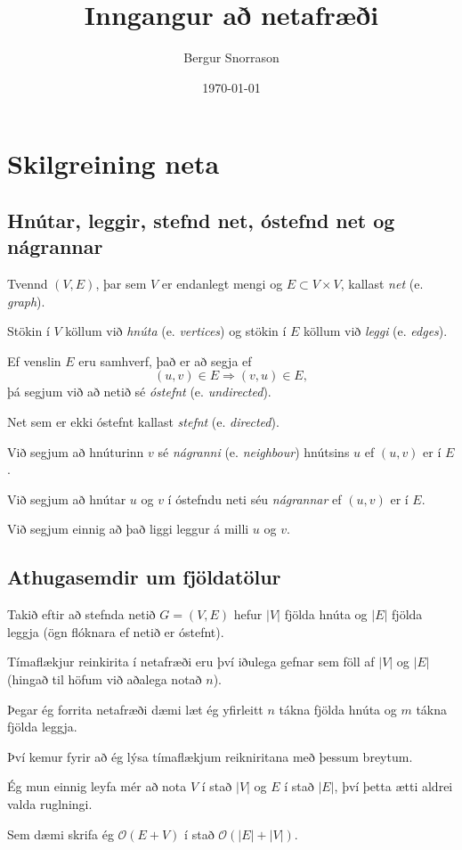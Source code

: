 \title{Inngangur að netafræði}
\author{Bergur Snorrason}
\date{\today}



\frame{\titlepage}

\section{Skilgreining neta}
\subsection{Hnútar, leggir, stefnd net, óstefnd net og nágrannar}
{
	{
		\item<1-> Tvennd $(V, E)$, þar sem $V$ er endanlegt mengi og $E \subset V \times V$, kallast \emph{net} (e. \emph{graph}).
		\item<2-> Stökin í $V$ köllum við \emph{hnúta} (e. \emph{vertices}) og stökin í $E$ köllum við \emph{leggi} (e. \emph{edges}).
		\item<3-> Ef venslin $E$ eru samhverf, það er að segja ef 
					\[
						(u, v) \in E \Rightarrow (v, u) \in E,
					\]
					þá segjum við að netið sé \emph{óstefnt} (e. \emph{undirected}).
		\item<4-> Net sem er ekki óstefnt kallast \emph{stefnt} (e. \emph{directed}).
		\item<5-> Við segjum að hnúturinn $v$ sé \emph{nágranni} (e. \emph{neighbour}) hnútsins $u$ ef $(u, v)$ er í $E$.
		\item<6-> Við segjum að hnútar $u$ og $v$ í óstefndu neti séu \emph{nágrannar} ef $(u, v)$ er í $E$.
		\item<7-> Við segjum einnig að það liggi leggur á milli $u$ og $v$.
	}
}

\subsection{Athugasemdir um fjöldatölur}
{
	{
		\item<1-> Takið eftir að stefnda netið $G = (V, E)$ hefur $|V|$ fjölda hnúta og $|E|$ fjölda leggja (ögn flóknara ef netið er óstefnt).
		\item<2-> Tímaflækjur reinkirita í netafræði eru því iðulega gefnar sem föll af $|V|$ og $|E|$ (hingað til höfum við aðalega notað $n$).
		\item<3-> Þegar ég forrita netafræði dæmi læt ég yfirleitt $n$ tákna fjölda hnúta og $m$ tákna fjölda leggja.
		\item<4-> Því kemur fyrir að ég lýsa tímaflækjum reikniritana með þessum breytum.
		\item<5-> Ég mun einnig leyfa mér að nota $V$ í stað $|V|$ og $E$ í stað $|E|$, því þetta ætti aldrei valda ruglningi.
		\item<6-> Sem dæmi skrifa ég $\mathcal{O}(E + V)$ í stað $\mathcal{O}(|E| + |V|)$.
	}
}

